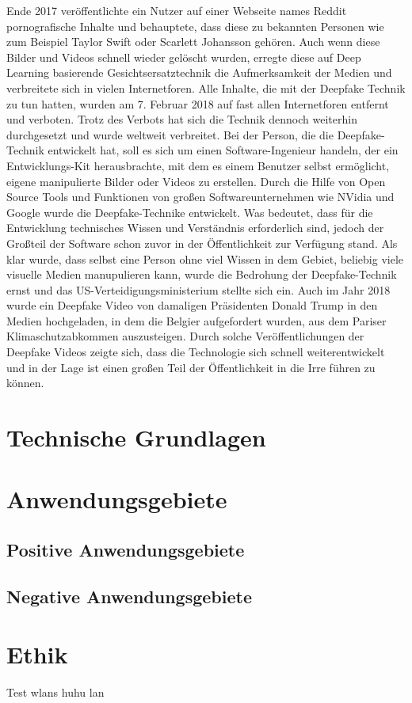 Ende 2017 veröffentlichte ein Nutzer auf einer Webseite names Reddit pornografische Inhalte und behauptete, dass diese zu bekannten Personen wie zum Beispiel Taylor Swift oder Scarlett Johansson gehören.
Auch wenn diese Bilder und Videos schnell wieder gelöscht wurden, erregte diese auf Deep Learning basierende Gesichtsersatztechnik die Aufmerksamkeit der Medien und verbreitete sich in vielen Internetforen.
Alle Inhalte, die mit der Deepfake Technik zu tun hatten, wurden am 7. Februar 2018 auf fast allen Internetforen entfernt und verboten.
Trotz des Verbots hat sich die Technik dennoch weiterhin durchgesetzt und wurde weltweit verbreitet.
Bei der Person, die die Deepfake-Technik entwickelt hat, soll es sich um einen Software-Ingenieur handeln, der ein Entwicklungs-Kit herausbrachte, mit dem es einem Benutzer selbst ermöglicht, eigene manipulierte Bilder oder Videos zu erstellen.
Durch die Hilfe von Open Source Tools und Funktionen von großen Softwareunternehmen wie NVidia und Google wurde die Deepfake-Technike entwickelt. Was bedeutet, dass für die Entwicklung technisches Wissen und Verständnis erforderlich sind, jedoch der Großteil der Software schon zuvor in der Öffentlichkeit zur Verfügung stand.
Als klar wurde, dass selbst eine Person ohne viel Wissen in dem Gebiet, beliebig viele visuelle Medien manupulieren kann, wurde die Bedrohung der Deepfake-Technik ernst und das US-Verteidigungsministerium stellte sich ein.
Auch im Jahr 2018 wurde ein Deepfake Video von damaligen Präsidenten Donald Trump in den Medien hochgeladen, in dem die Belgier aufgefordert wurden, aus dem Pariser Klimaschutzabkommen auszusteigen.\newline
Durch solche Veröffentlichungen der Deepfake Videos zeigte sich, dass die Technologie sich schnell weiterentwickelt und in der Lage ist einen großen Teil der Öffentlichkeit in die Irre führen zu können.\cite{Jatit}


\section{Technische Grundlagen}
\section{Anwendungsgebiete}
\subsection{Positive Anwendungsgebiete}
\subsection{Negative Anwendungsgebiete}
\section{Ethik}
Test \glspl{wlan} huhu \gls{lan} \\
\cite{google} \\